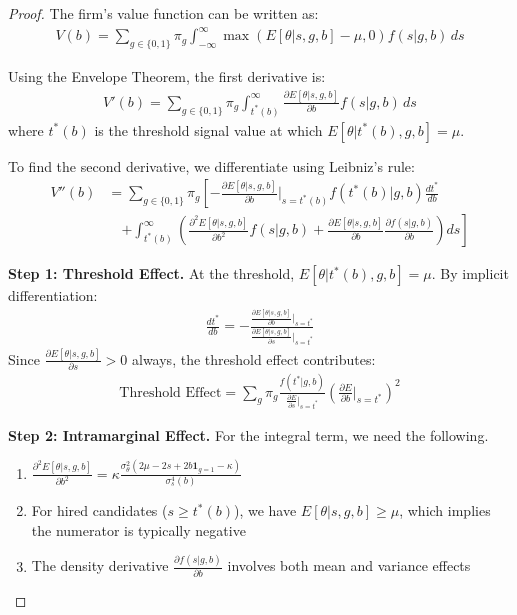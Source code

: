 \documentclass[12pt,a4paper]{article}
\theoremstyle{definition}
\theoremstyle{remark}
\begin{document}
\begin{proof}
The firm's value function can be written as:
\begin{align}
V(b) = \sum_{g \in \{0,1\}} \pi_g \int_{-\infty}^\infty \max(E[\theta|s,g,b] - \mu, 0) f(s|g,b) \, ds
\end{align}

Using the Envelope Theorem, the first derivative is:
\begin{align}
V'(b) = \sum_{g \in \{0,1\}} \pi_g \int_{t^*(b)}^\infty \frac{\partial E[\theta|s,g,b]}{\partial b} f(s|g,b) \, ds
\end{align}
where $t^*(b)$ is the threshold signal value at which $E[\theta|t^*(b),g,b] = \mu$.

To find the second derivative, we differentiate using Leibniz's rule:
\begin{align}
V''(b) &= \sum_{g \in \{0,1\}} \pi_g \left[ -\frac{\partial E[\theta|s,g,b]}{\partial b}\bigg|_{s=t^*(b)} f(t^*(b)|g,b) \frac{dt^*}{db} \right. \\
&\quad \left. + \int_{t^*(b)}^\infty \left( \frac{\partial^2 E[\theta|s,g,b]}{\partial b^2} f(s|g,b) + \frac{\partial E[\theta|s,g,b]}{\partial b} \frac{\partial f(s|g,b)}{\partial b} \right) ds \right]
\end{align}

\textbf{Step 1: Threshold Effect.} At the threshold, $E[\theta|t^*(b),g,b] = \mu$. By implicit differentiation:
\begin{align}
\frac{dt^*}{db} = -\frac{\frac{\partial E[\theta|s,g,b]}{\partial b}\big|_{s=t^*}}{\frac{\partial E[\theta|s,g,b]}{\partial s}\big|_{s=t^*}}
\end{align}
Since $\frac{\partial E[\theta|s,g,b]}{\partial s} > 0$ always, the threshold effect contributes:
\begin{align}
\text{Threshold Effect} = \sum_{g} \pi_g \frac{f(t^*|g,b)}{\frac{\partial E}{\partial s}\big|_{s=t^*}} \left(\frac{\partial E}{\partial b}\bigg|_{s=t^*}\right)^2
\end{align}

\textbf{Step 2: Intramarginal Effect.} For the integral term, we need the following.
\begin{enumerate}
    \item $\frac{\partial^2 E[\theta|s,g,b]}{\partial b^2} = \kappa \frac{\sigma_\theta^2 (2\mu - 2s + 2b\mathbf{1}_{g=1} - \kappa)}{\sigma_s^4(b)}$
    \item For hired candidates ($s \geq t^*(b)$), we have $E[\theta|s,g,b] \geq \mu$, which implies the numerator is typically negative
    \item The density derivative $\frac{\partial f(s|g,b)}{\partial b}$ involves both mean and variance effects
\end{enumerate}


\end{proof}
\end{document}
